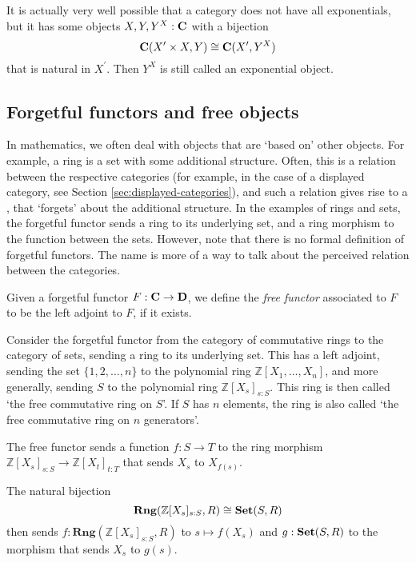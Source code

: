 \begin{remark}
  It is actually very well possible that a category does not have all exponentials, but it has some objects $ X, Y, Y^X: \mathbf{C} $ with a bijection
  \[ \mathbf{C}(X^\prime \times X, Y) \cong \mathbf{C}(X^\prime, Y^X) \]
  that is natural in $ X^\prime $. Then $ Y^X $ is still called an exponential object.
\end{remark}

\subsection{Forgetful functors and free objects}

In mathematics, we often deal with objects that are `based on' other objects. For example, a ring is a set with some additional structure. Often, this is a relation between the respective categories (for example, in the case of a displayed category, see Section \ref{sec:displayed-categories}), and such a relation gives rise to a , that `forgets' about the additional structure. In the examples of rings and sets, the forgetful functor sends a ring to its underlying set, and a ring morphism to the function between the sets. However, note that there is no formal definition of forgetful functors. The name is more of a way to talk about the perceived relation between the categories.

\begin{definition}
  Given a forgetful functor $ F: \mathbf{C} \to \mathbf{D} $, we define the \textit{free functor} associated to $ F $ to be the left adjoint to $ F $, if it exists.
\end{definition}

\begin{example}
  Consider the forgetful functor from the category of commutative rings to the category of sets, sending a ring to its underlying set. This has a left adjoint, sending the set $ \{ 1, 2, \dots, n \} $ to the polynomial ring $ \mathbb Z[X_1, \dots, X_n] $, and more generally, sending $ S $ to the polynomial ring $ \mathbb Z[X_s]_{s : S} $. This ring is then called `the free commutative ring on $ S $'. If $ S $ has $ n $ elements, the ring is also called `the free commutative ring on $ n $ generators'.

  The free functor sends a function $ f: S \to T $ to the ring morphism $ \mathbb Z[X_s]_{s: S} \to \mathbb Z[X_t]_{t: T} $ that sends $ X_s $ to $ X_{f(s)} $.

  The natural bijection
  \[ \mathbf{Rng}(\mathbb Z[X_s]_{s : S}, R) \cong \mathbf{Set}(S, R) \]
  then sends $ f: \mathbf{Rng}(\mathbb Z[X_s]_{s : S}, R) $ to $ s \mapsto f(X_s) $ and $ g: \mathbf{Set}(S, R) $ to the morphism that sends $ X_s $ to $ g(s) $.
\end{example}

